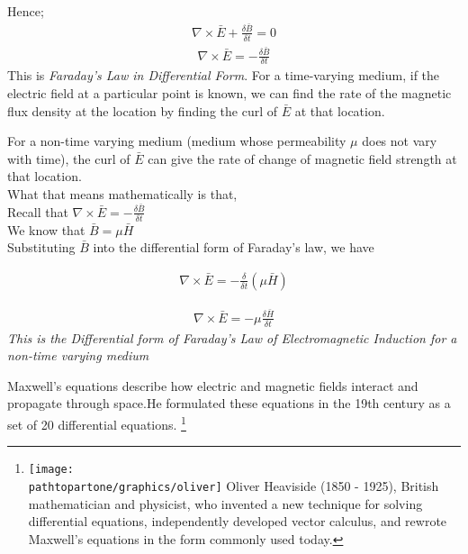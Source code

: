 Hence;
\begin{align*}
	\nabla \times \bar{E}+ \frac{\delta \bar{B}}{\delta t} = 0
\end{align*}
\begin{align}
	\nabla \times \bar{E} = -\frac{\delta \bar{B}}{\delta t}
\end{align}
This is \emph{Faraday's Law in Differential Form}. For a time-varying medium, if the electric field at a particular point is known, we can find the rate of the magnetic flux density at the location by finding the curl of $\bar{E}$ at that location.

For a non-time varying medium (medium whose permeability $\mu$ does not vary with time), the curl of $\bar{E}$ can give the rate of change of magnetic field strength at that location.\\

What that means mathematically is that,\\


Recall that $\nabla \times \bar{E} = - \frac{\delta\bar{B}}{\delta t}$\\


We know that $\bar{B} = \mu \bar{H}$ $\quad$\\

Substituting $\bar{B}$ into the differential form of Faraday's law, we have	


\begin{align*}
	\nabla \times \bar{E} = - \frac{\delta}{\delta t} (\mu\bar{H})
\end{align*}

\begin{align}
	\nabla \times \bar{E} = -\mu\frac{\delta \bar{H}}{\delta t}
\end{align}
\emph{This is the Differential form of Faraday's Law of Electromagnetic Induction for a non-time varying medium}

Maxwell's equations describe how electric and magnetic fields interact and propagate through space.He formulated these equations in the 19th century as a set of 20 differential equations. 
\footnote{
\texttt{[image: \\pathtopartone/graphics/oliver]} 
Oliver Heaviside (1850 - 1925), British mathematician and physicist, who invented a new technique for solving differential equations, independently developed vector calculus, and rewrote Maxwell's equations in the form commonly used today.
}


